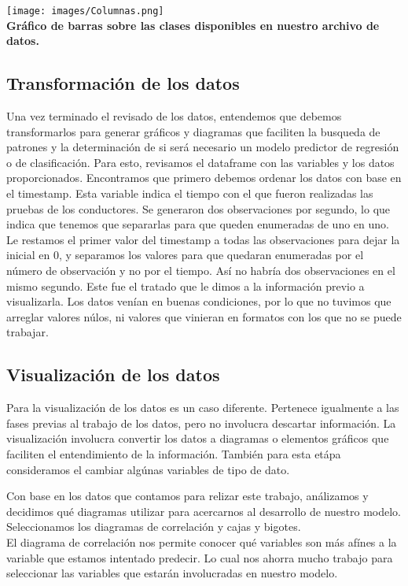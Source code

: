 \documentclass{article}
\begin{document}
        \texttt{[image: images/Columnas.png]} \\

        \textbf{Gráfico de barras sobre las clases disponibles en nuestro archivo de datos.} \\

    \subsection{Transformación de los datos}

        Una vez terminado el revisado de los datos, entendemos que debemos transformarlos para generar gráficos y diagramas que faciliten la busqueda de patrones y la determinación de si será necesario un modelo predictor de regresión o de clasificación.
        Para esto, revisamos el dataframe con las variables y los datos proporcionados. Encontramos que primero debemos ordenar los datos con base en el timestamp. Esta variable indica el tiempo con el que fueron realizadas las pruebas de los conductores. Se generaron dos observaciones por segundo, lo que indica que tenemos que separarlas para que queden enumeradas de uno en uno. Le restamos el primer valor del timestamp a todas las observaciones para dejar la inicial en 0, y separamos los valores para que quedaran enumeradas por el número de observación y no por el tiempo. Así no habría dos observaciones en el mismo segundo.
        Este fue el tratado que le dimos a la información previo a visualizarla. Los datos venían en buenas condiciones, por lo que no tuvimos que arreglar valores núlos, ni valores que vinieran en formatos con los que no se puede trabajar.
            

    \subsection{Visualización de los datos}

        Para la visualización de los datos es un caso diferente. Pertenece igualmente a las fases previas al trabajo de los datos, pero no involucra descartar información. La visualización involucra convertir los datos a diagramas o elementos gráficos que faciliten el entendimiento de la información. También para esta etápa consideramos el cambiar algúnas variables de tipo de dato.

        Con base en los datos que contamos para relizar este trabajo, análizamos y decidimos qué diagramas utilizar para acercarnos al desarrollo de nuestro modelo. Seleccionamos los diagramas de correlación y cajas y bigotes. \\
        El diagrama de correlación nos permite conocer qué variables son más afínes a la variable que estamos intentado predecir. Lo cual nos ahorra mucho trabajo para seleccionar las variables que estarán involucradas en nuestro modelo. \\
\end{document}
